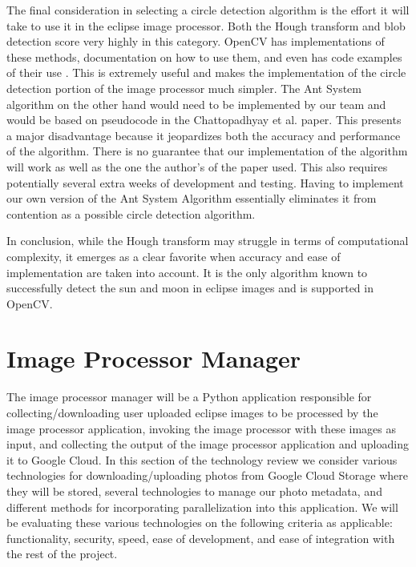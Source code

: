 \documentclass[10pt, onecolumn, draftclsnofoot, letterpaper, compsoc]{IEEEtran}
\begin{document}
The final consideration in selecting a circle detection algorithm is the effort
it will take to use it in the eclipse image processor. Both the Hough transform
and blob detection score very highly in this category. OpenCV has
implementations of these methods, documentation on how to use them, and even has
code examples of their use \cite{houghocv, blobarticle}. This is extremely useful
and makes the implementation of the circle detection portion of the image
processor much simpler. The Ant System algorithm on the other hand would need to
be implemented by our team and would be based on pseudocode in the Chattopadhyay
et al. paper. This presents a major disadvantage because it jeopardizes both the
accuracy and performance of the algorithm. There is no guarantee that our
implementation of the algorithm will work as well as the one the author’s of the
paper used. This also requires potentially several extra weeks of development
and testing. Having to implement our own version of the Ant System Algorithm
essentially eliminates it from contention as a possible circle detection
algorithm.


In conclusion, while the Hough transform may struggle in terms of computational
complexity, it emerges as a clear favorite when accuracy and ease of
implementation are taken into account. It is the only algorithm known to
successfully detect the sun and moon in eclipse images and is supported in
OpenCV.

\section{Image Processor Manager}

The image processor manager will be a Python application responsible for  
collecting/downloading user uploaded eclipse images to be processed by the image
processor application, invoking the image processor with these images as input,
and collecting the output of the image processor application and uploading it
to Google Cloud. In this section of the technology review we consider various
technologies for downloading/uploading photos from Google Cloud Storage where
they will be stored, several technologies to manage our photo metadata, and
different methods for incorporating parallelization into this application. We will
be evaluating these various technologies on the following criteria as applicable:
functionality, security, speed, ease of development, and ease of integration with
the rest of the project.
\end{document}
